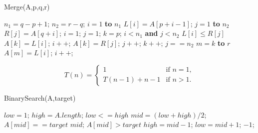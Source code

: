\documentclass[review, authoryear, 3p, 12pt]{elsarticle}
\begin{document}
	\begin{algorithm}[htbp]
		\caption{Merge(A,p,q,r)}
		\begin{codebox}
			\li 	$n_1=q-p+1$;
			\li 	$n_2=r-q$;
			\li 	{}
			\li 	\For $i=1$ \textbf{to} $n_1$
					\Do
			\li 		$L[i] = A[p+i-1]$;
						\End
			\li 	\For $j=1$ \textbf{to} $n_2$
					\Do
			\li 		$R[j] = A[q+i]$;
					\End
			\li 	$i=1$;
			\li 	$j=1$;
			\li 	$k=p$;
			\li 	\While $i < n_1$ \textbf{and} $j < n_2$
					\Do
			\li 		\If $L[i] \leq R[j]$
						\Do
			\li 			$A[k]=L[i]$;
			\li 			$i++$;
			\li			\Else
			\li 			$A[k]=R[j]$;
			\li 			$j++$;
						\End
			\li			$k++$;
					\End
			\li 	\If $j==n_2$
					\Do
			\li 		\For $m=k$ \textbf{to} $r$
							\Do
			\li 				$A[m] = L[i]$;
			\li 				$i++$;
						\End
					\End
		\end{codebox}
	\end{algorithm}
	
	\begin{equation*}
		T(n)=
		\begin{cases}
			1 &\text{if $n=1$},\\
			T(n-1)+n-1 &\text{if $n>1$}.
		\end{cases}
	\end{equation*}
	
	\begin{algorithm}[htbp]
		\caption{BinarySearch(A,target)}
		\begin{codebox}
			\li 	$low=1$;
			\li 	$high=A.length$;
			\li 	\While $low <= high$
					\Do
			\li 		$mid=(low+high)/2$;
			\li 		\If $A[mid] == target$
						\Do
			\li 			\Return $mid$;
						\End
			\li 		\If $A[mid] > target$
						\Do
			\li 			$high = mid-1$;
			\li 		\Else
			\li 			$low=mid+1$;
						\End
					\End
			\li 	\Return $-1$;
		\end{codebox}
	\end{algorithm}
\end{document}
